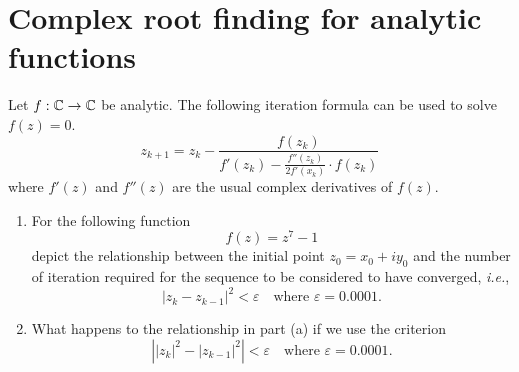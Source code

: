 \section{Complex root finding for analytic functions}
Let \(f:\mathbb{C}\to\mathbb{C}\) be analytic.
The following iteration formula can be used to solve \(f(z)=0\).
\[ z_{k+1}=z_k-\frac{f(z_k)}{f'(z_k)-\frac{f''(z_k)}{2f'(x_k)}\cdot f(z_k)} \]
where \(f'(z)\) and \(f''(z)\) are the usual complex derivatives of \(f(z)\).
\begin{enumerate}
	\item For the following function
	\[ f(z)=z^7-1 \]
	depict the relationship between the initial point \(z_0=x_0+i y_0\) and the number of iteration required for the sequence to be considered to have converged, \textit{i.e.},
	\[ |z_k - z_{k-1}|^2 < \varepsilon \quad \text{where } \varepsilon=0.0001. \]
	\item What happens to the relationship in part (a) if we use the criterion 
	\[ \left| |z_k|^2 - |z_{k-1}|^2\right| < \varepsilon \quad \text{where } \varepsilon=0.0001. \]
\end{enumerate}


